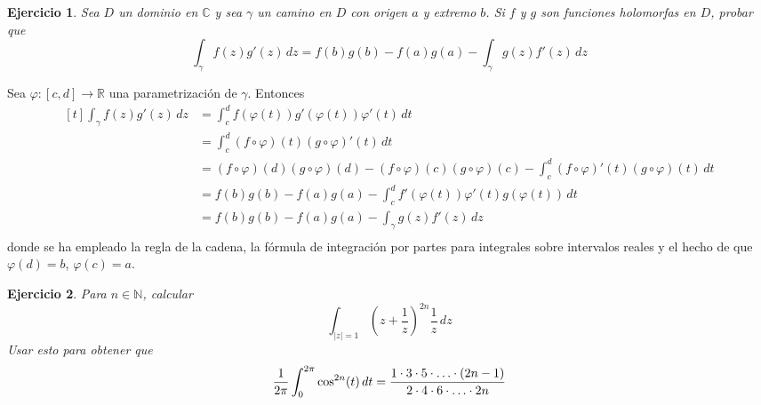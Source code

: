 \documentclass[11pt]{report}
\makeatletter
\renewenvironment{proof}[1][\proofname]{\par
  \pushQED{\qed}%
  \normalfont \topsep\z@skip %
  \trivlist
  \item[\hskip\labelsep
        \itshape
    #1\@addpunct{.}]\ignorespaces
}{%
  \popQED\endtrivlist\@endpefalse
}
\newcommand{\R}{\mathbb R}
\newcommand{\N}{\mathbb N}
\newcommand{\C}{\mathbb C}
\newtheorem{exercise}{Ejercicio}
\makeatother
\begin{document}
\begin{exercise}
Sea $D$ un dominio en $\C$ y sea $\gamma$ un camino en $D$ con origen $a$ y extremo $b$. Si $f$ y $g$ son funciones holomorfas en $D$, probar que
\[\int_\gamma f(z)g'(z)\, dz = f(b)g(b)-f(a)g(a)-\int_\gamma g(z)f'(z)\, dz\]
\end{exercise}

\begin{proof}
Sea $\varphi \colon [c,d] \to \R$ una parametrización de $\gamma$. Entonces
\[\begin{aligned}[t]
    \int_\gamma f(z)g'(z) \, dz &= \int_c^d f(\varphi(t))g'(\varphi(t))\varphi'(t) \, dt \\ &=  \int_c^d (f \circ \varphi)(t)(g \circ \varphi)'(t) \, dt \\
    &= (f \circ \varphi)(d)(g \circ \varphi)(d)-(f \circ \varphi)(c)(g \circ \varphi)(c)-\int_c^d (f \circ \varphi)'(t)(g \circ \varphi)(t) \, dt \\
    &= f(b)g(b)-f(a)g(a)-\int_c^d f'(\varphi(t))\varphi'(t)g(\varphi(t)) \, dt \\
    &= f(b)g(b)-f(a)g(a)-\int_\gamma g(z)f'(z) \, dz \\
\end{aligned}\]
donde se ha empleado la regla de la cadena, la fórmula de integración por partes para integrales sobre intervalos reales y el hecho de que $\varphi(d) = b$, $\varphi(c) = a$.
\end{proof}

\begin{exercise}
Para $n \in \N$, calcular
\[\int_{|z|=1} \left(z+\frac{1}{z}\right)^{2n} \frac{1}{z}\, dz\]
Usar esto para obtener que
\[\frac{1}{2\pi}\int_0^{2\pi} \cos^{2n}(t) \, dt = \frac{1\cdot 3 \cdot 5 \cdot \mathellipsis \cdot (2n-1)}{2\cdot 4 \cdot 6 \cdot \mathellipsis \cdot 2n}\]
\end{exercise}
\end{document}
